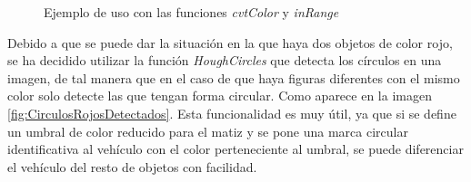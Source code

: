 \begin{figure}[hbtp]
 \centering
 \caption{Ejemplo de uso con las funciones \emph{cvtColor} y \emph{inRange}}
 \label{fig:CirculosDetectados}
\end{figure}

Debido a que se puede dar la situación en la que haya dos objetos de color rojo, se ha decidido utilizar la función \emph{HoughCircles} que detecta los círculos en una imagen, de tal manera que en el caso de que haya figuras diferentes con el mismo color solo detecte las que tengan forma circular. Como aparece en la imagen \ref{fig:CirculosRojosDetectados}. Esta funcionalidad es muy útil, ya que si se define un umbral de color reducido para el matiz y se pone una marca circular identificativa al vehículo con el color perteneciente al umbral, se puede diferenciar el vehículo del resto de objetos con facilidad.

